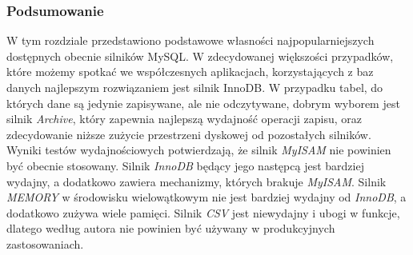 \subsubsection{Podsumowanie}

W tym rozdziale przedstawiono podstawowe własności najpopularniejszych dostępnych obecnie silników MySQL. W zdecydowanej większości przypadków, które możemy spotkać we współczesnych aplikacjach, korzystających z baz danych najlepszym rozwiązaniem jest silnik InnoDB. W przypadku tabel, do których dane są jedynie zapisywane, ale nie odczytywane, dobrym wyborem jest silnik \textit{Archive}, który zapewnia najlepszą wydajność operacji zapisu, oraz zdecydowanie niższe zużycie przestrzeni dyskowej od pozostałych silników. Wyniki testów wydajnościowych potwierdzają, że silnik \textit{MyISAM} nie powinien być obecnie stosowany. Silnik \textit{InnoDB} będący jego następcą jest bardziej wydajny, a dodatkowo zawiera mechanizmy, których brakuje \textit{MyISAM}. Silnik \textit{MEMORY} w środowisku wielowątkowym nie jest bardziej wydajny od \textit{InnoDB}, a dodatkowo zużywa wiele pamięci. Silnik \textit{CSV} jest niewydajny i ubogi w funkcje, dlatego według autora nie powinien być używany w produkcyjnych zastosowaniach.